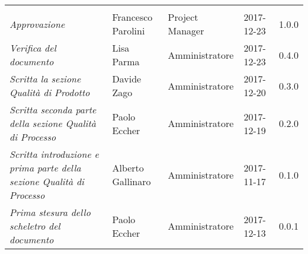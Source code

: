 \newpage 
\section*{}
\begin{table}[H]
	\centering
	\begin{tabular}{p{4cm}|C{3cm}|C{3cm}|R{2.5cm}|R{2cm}}
		
		 & & & & \\
		
		
		\emph{Approvazione}& Francesco Parolini & Project Manager & 2017-12-23 & 1.0.0 \\
		\hline
		
		\emph{Verifica del documento}& Lisa Parma & Amministratore & 2017-12-23 & 0.4.0 \\
		\hline
		
		\emph{Scritta la sezione Qualità di Prodotto}& Davide Zago & Amministratore & 2017-12-20 & 0.3.0 \\
		\hline
		
		\emph{Scritta seconda parte della sezione Qualità di Processo}& Paolo Eccher & Amministratore & 2017-12-19 & 0.2.0 \\
		\hline
		
		\emph{Scritta introduzione e prima parte della sezione Qualità di Processo} & Alberto Gallinaro & Amministratore & 2017-11-17 & 0.1.0 \\
		\hline
		
		\emph{Prima stesura dello scheletro del documento} & Paolo Eccher & Amministratore & 2017-12-13 & 0.0.1 \\
		
	\end{tabular}
	
\end{table}


\clearpage